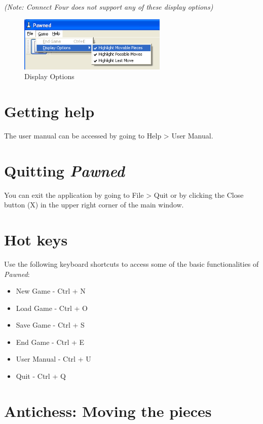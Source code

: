 \documentclass{report}
\begin{document}
			\textit{(Note: Connect Four does not support any of these display options)}
			
				\begin{figure}
					\begin{center}
						\includegraphics[width=200pt]{img/display-options.png}
							\caption{Display Options}						
					\end{center}
				\end{figure}
			
			\section{Getting help}
			
			The user manual can be accessed by going to Help > User Manual.
			
			\section{Quitting \emph{Pawned}}
			
			You can exit the application by going to File > Quit or by clicking the Close
			button (X) in the upper right corner of the main window.
			
			\section{Hot keys}
			
			Use the following keyboard shortcuts to access some of the basic 
			functionalities of \emph{Pawned}:
			
				\begin{itemize}
					\item New Game - Ctrl + N
					\item Load Game - Ctrl + O
					\item Save Game - Ctrl + S
					\item End Game - Ctrl + E
					\item User Manual - Ctrl + U
					\item Quit - Ctrl + Q
				\end{itemize}			
								
			
			\section{Antichess: Moving the pieces}
			
\end{document}
